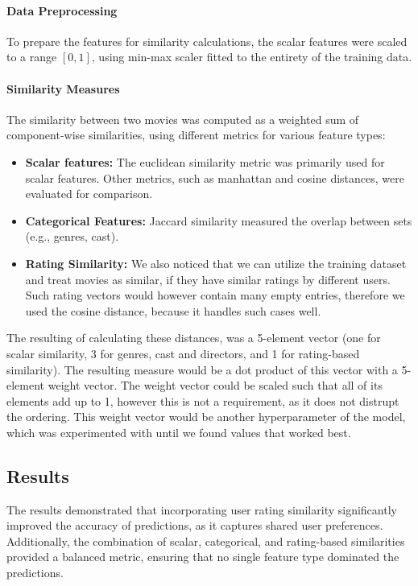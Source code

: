 \documentclass[a4paper,9pt]{article}
\begin{document}
\paragraph{Data Preprocessing}
To prepare the features for similarity calculations, the scalar features were scaled to a range $[0,1]$, using min-max scaler fitted to the entirety of the training data.

\paragraph{Similarity Measures}
The similarity between two movies was computed as a weighted sum of component-wise similarities,
using different metrics for various feature types:

\begin{itemize}
	\item \textbf{Scalar features:} The euclidean similarity metric was primarily used for scalar features. Other metrics, such as manhattan and cosine distances, were evaluated for comparison.
	\item \textbf{Categorical Features:} Jaccard similarity measured the overlap between sets (e.g., genres, cast).
	\item \textbf{Rating Similarity:} We also noticed that we can utilize the training dataset and treat movies as similar, if they have similar ratings by different users. Such rating vectors would however contain many empty entries, therefore we used the cosine distance, because it handles such cases well.
\end{itemize}

The resulting of calculating these distances, was a 5-element vector (one for scalar similarity, 3 for genres, cast and directors, and 1 for rating-based similarity).
The resulting measure would be a dot product of this vector with a 5-element weight vector.
The weight vector could be scaled such that all of its elements add up to 1, however this is not a requirement, as it does not distrupt the ordering.
This weight vector would be another hyperparameter of the model, which was experimented with until we found values that worked best.

\subsection{Results}
The results demonstrated that incorporating user rating similarity significantly improved the accuracy of predictions, as it captures shared user preferences. Additionally, the combination of scalar, categorical, and rating-based similarities provided a balanced metric, ensuring that no single feature type dominated the predictions.
\end{document}
